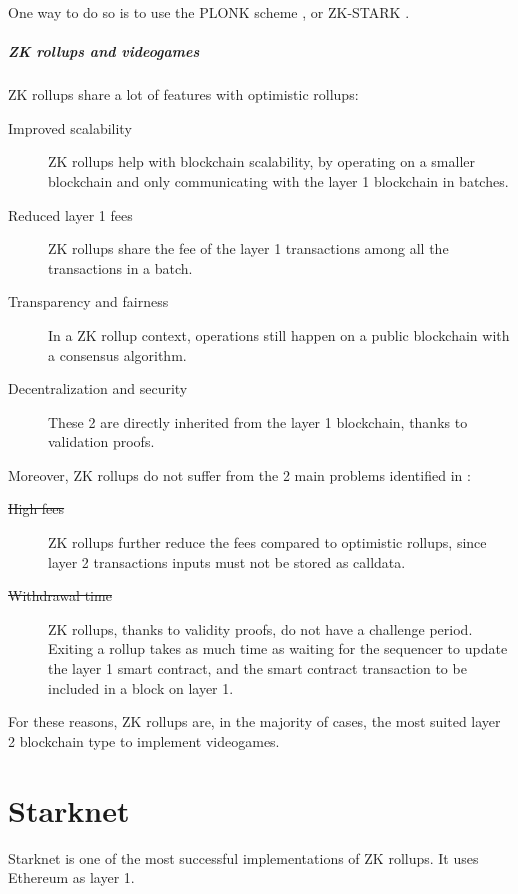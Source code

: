 \documentclass[12pt]{article}
\begin{document}
One way to do so is to use the PLONK scheme \cite{plonk}, or ZK-STARK \cite{zk-stark}.

\subsubsection{ZK rollups and videogames} \label{subsubsection:zkrav}
ZK rollups share a lot of features with optimistic rollups:
\begin{description}
    \item[Improved scalability] ZK rollups help with blockchain scalability, by operating on a smaller blockchain and only communicating with the layer 1 blockchain in batches.
    \item[Reduced layer 1 fees] ZK rollups share the fee of the layer 1 transactions among all the transactions in a batch.
    \item[Transparency and fairness] In a ZK rollup context, operations still happen on a public blockchain with a consensus algorithm.
    \item[Decentralization and security] These 2 are directly inherited from the layer 1 blockchain, thanks to validation proofs. 
\end{description}

Moreover, ZK rollups do not suffer from the 2 main problems identified in :
\begin{description}
    \item[\st{High fees}] ZK rollups further reduce the fees compared to optimistic rollups, since layer 2 transactions inputs must not be stored as calldata.
    \item[\st{Withdrawal time}] ZK rollups, thanks to validity proofs, do not have a challenge period. Exiting a rollup takes as much time as waiting for the sequencer to update the layer 1 smart contract, and the smart contract transaction to be included in a block on layer 1.  
\end{description}

For these reasons, ZK rollups are, in the majority of cases, the most suited layer 2 blockchain type to implement videogames.

\newpage
\part{Starknet} \label{part:starknet}
Starknet is one of the most successful implementations of ZK rollups. It uses Ethereum as layer 1.
\end{document}
